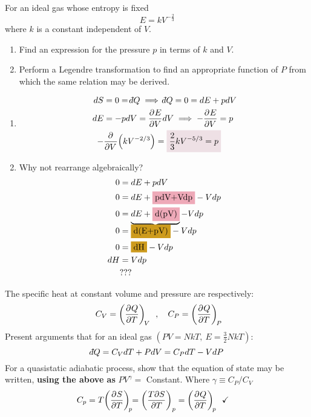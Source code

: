 \documentclass{article}
\def\dbar{{\mathchar'26\mkern-12mu d}} %
\begin{document}
    \begin{problem}
        For an ideal gas whose entropy is fixed $$E=kV^{-\frac{2}{3}}$$ where $k$ is a constant independent of $V$.
        \begin{enumerate}[label=(\alph*)]
            \item Find an expression for the pressure $p$ in terms of $k$ and $V$.
            \item Perform a Legendre transformation to find an appropriate function
            of $P$ from which the same relation may be derived.
        \end{enumerate}
        \answerline
        \begin{enumerate}[label=\alph*)]
            \item 
            \begin{align*}
                dS&=0=\dbar Q\implies \dbar Q=0=dE+pdV
                \\
                dE&=-pdV=\pder{E}{V}dV\implies -\pder{E}{V}=p
                \\
                -&\pder{V}\qty(kV^{-2/3})=\coloredanswer{\frac{2}{3}kV^{-5/3}=p}
            \end{align*}
            \item Why not rearrange algebraically? 
            \begin{align*}
                0&=dE+pdV
                \\
                0&=dE+\colorbox{Pink2}{pdV+Vdp}-Vdp
                \\
                0&=\underbrace{dE+\colorbox{Pink2}{d(pV)}}-Vdp
                \\[-0.25cm]
                0&=\colorbox{Goldenrod3}{d(E+pV)}-Vdp
                \\
                0&=\colorbox{Goldenrod3}{dH}-Vdp
                \\
                dH&=Vdp
                \\
                &???
            \end{align*}
        \end{enumerate}
    \end{problem}\newpage
    \begin{problem}
        The specific heat at constant volume and pressure are respectively: 
        $$C_V=\pder{Q}{T}[V]\quad,\quad C_P=\pder{Q}{T}[P]$$ Present arguments that for an ideal gas $(PV=NkT,~E=\frac{3}{2}NkT)$:
        $$\dbar Q=C_VdT+PdV=C_PdT-VdP$$
        For a quasistatic adiabatic process, show that the equation of state may be written, \textbf{using the above as} $PV^\gamma=$ Constant. Where $\gamma\equiv C_P/C_V$
        \answerline
        \begin{align*}
            C_p&=T\pder{S}{T}[p]=\qty(\frac{T\partial S}{\partial T})_{p}=\pder{Q}{T}[p]\quad\checkmark
        \end{align*}
    \end{problem}\newpage
\end{document}

